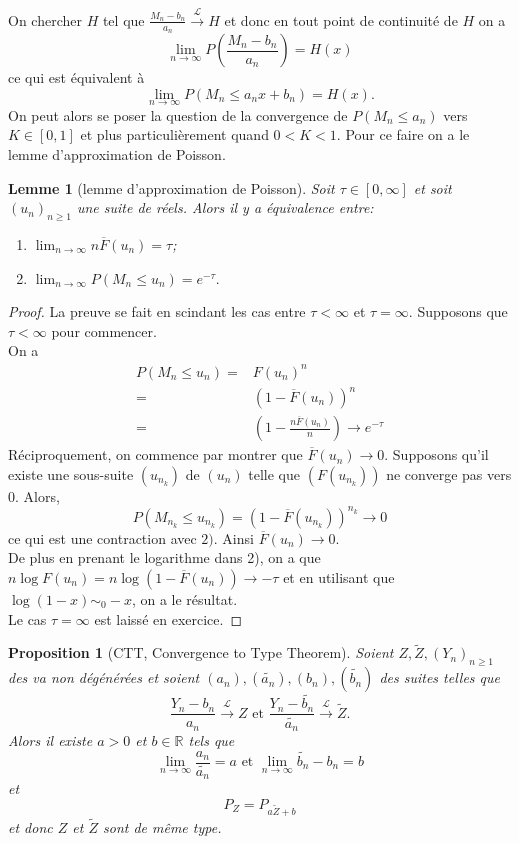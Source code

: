\documentclass[10p,a4paper,reqno,titlepage]{report}
\newcommand{\R}{\mathbb{R}}
\newcounter{dader}[chapter]
\theoremstyle{plain}
\newtheorem{prop}[prop]{Proposition}
\newtheorem{lemme}[dader]{Lemme}%
\theoremstyle{definition}
\newcommand{\cvloi}{\stackrel{\mathcal{L}}{\longrightarrow}}
\begin{document}
On chercher $H$ tel que $ \frac{M_n - b_n}{a_n} \cvloi H$ et donc en tout point de continuité de $H$ on a 
$$ \lim_{n\to \infty} P\left(\frac{M_n -b_n}{a_n}\right)=H(x)$$
ce qui est équivalent à 
$$ \lim_{n\to \infty} P(M_n \leq a_n x +b_n) = H(x).$$
On peut alors se poser la question de la convergence de $P(M_n \leq a_n)$ vers $K \in [0,1]$ et plus particulièrement quand $0 < K < 1.$ Pour ce faire on a le lemme d'approximation de Poisson.
\begin{lemme}[lemme d'approximation de Poisson]\label{lemmepoisson}
Soit $\tau \in [0,\infty]$ et soit $(u_n)_{n\geq 1}$ une suite de réels. Alors il y a équivalence entre:\
\begin{enumerate}
	\item $ \lim_{n\to\infty} n \overline{F}(u_n) = \tau$;
	\item $\lim_{n \to \infty} P(M_n \leq u_n) = e^{-\tau}.$
\end{enumerate}
\end{lemme}
\begin{proof}
	La preuve se fait en scindant les cas entre $\tau < \infty$ et $\tau=\infty.$ Supposons que $\tau < \infty$ pour commencer. \\
	On a 
	\begin{align*}
		P(M_n \leq u_n) = & F(u_n)^n\\
		=& (1-\overline{F}(u_n))^n \\
		= & \left(1- \frac{n\overline{F}(u_n)}{n}\right) \to e^{-\tau}
	\end{align*}
Réciproquement, on commence par montrer que $\overline{F}(u_n) \to 0$. Supposons qu'il existe une sous-suite $(u_{n_k})$ de $(u_n)$ telle que $(F(u_{n_k}))$ ne converge pas vers $0$. Alors,
$$ P(M_{n_k} \leq u_{n_k}) =\left(1 - \overline{F}(u_{n_k})\right)^{n_k}\to 0 $$
ce qui est une contraction avec $2)$. Ainsi $\overline{F}(u_n) \to 0$. \\
De plus en prenant le logarithme dans 2), on a que $n \log F(u_n) = n \log(1-\overline{F}(u_n)) \to -\tau$ et en utilisant que $\log(1-x) \sim_0 -x$, on a le résultat.\\
Le cas $\tau=\infty$ est laissé en exercice.

\end{proof}
\begin{prop}[CTT, Convergence to Type Theorem]\label{CTT}
	Soient $Z , \tilde Z , (Y_n)_{n\geq 1}$ des va non dégénérées et soient $(a_n), (\tilde{a_n}),(b_n),(\tilde{b_n})$ des suites telles que 
	$$ \frac{Y_n -b_n}{a_n} \cvloi Z \text{ et } \frac{Y_n-\tilde{b_n}}{\tilde{a_n}} \cvloi \tilde Z.$$
	Alors il existe $a > 0$ et $b \in \R$ tels que 
	$$ \lim_{n\to\infty}\frac{a_n}{\tilde{a_n}} =a \text{ et } \lim_{n\to\infty} \tilde{b_n} - b_n = b$$
	 et 
	 $$P_{Z}= P_{a \tilde Z + b}$$
	et donc $Z $ et $\tilde Z $ sont de même type.
\end{prop}
\end{document}
